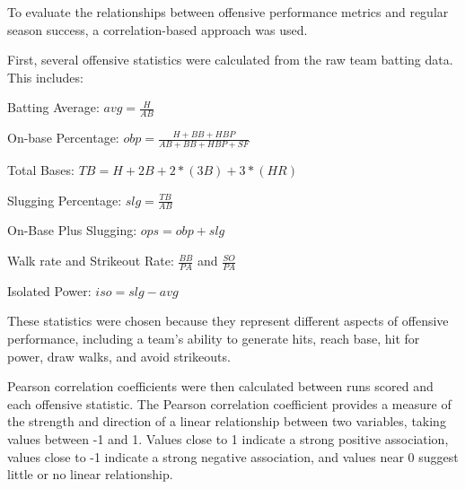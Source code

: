 \documentclass{article}
\begin{document}
\hspace{12pt} To evaluate the relationships between offensive performance metrics and regular season success, a correlation-based approach was used. 

\vspace{5pt}

First, several offensive statistics were calculated from the raw team batting data. This includes: 

\vspace{5pt}

Batting Average: $avg = \frac{H}{AB}$ 

\vspace{5pt}

On-base Percentage: $obp = \frac{H + BB + HBP}{AB + BB + HBP + SF}$

\vspace{5pt}

Total Bases: $TB = H + 2B + 2*(3B) + 3*(HR)$

\vspace{5pt}

Slugging Percentage: $slg = \frac{TB}{AB}$

\vspace{5pt}

On-Base Plus Slugging: $ops = obp + slg$

\vspace{5pt}

Walk rate and Strikeout Rate: $\frac{BB}{PA}$ and $\frac{SO}{PA}$

\vspace{5pt}

Isolated Power: $iso = slg - avg$

\vspace{10pt}

These statistics were chosen because they represent different aspects of offensive performance, including a team's ability to generate hits, reach base, hit for 
power, draw walks, and avoid strikeouts.

\vspace{5pt}

Pearson correlation coefficients were then calculated between runs scored and each offensive statistic. The Pearson correlation coefficient provides a 
measure of the strength and direction of a linear relationship between two variables, taking values between -1 and 1. Values close to 1 indicate a strong positive 
association, values close to -1 indicate a strong negative association, and values near 0 suggest little or no linear relationship.
\end{document}
